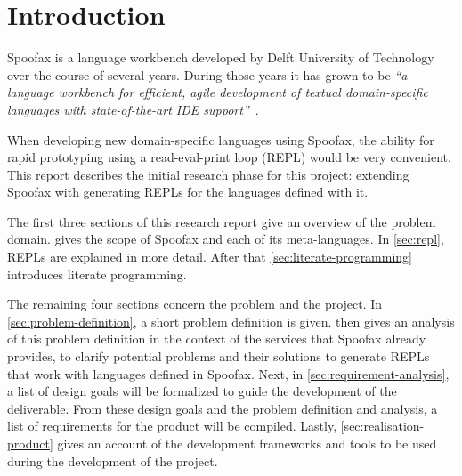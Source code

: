 \section*{Introduction}
\label{sec:introduction}

Spoofax is a language workbench developed by Delft University of
Technology over the course of several years. During those years it has
grown to be \textit{``a language workbench for efficient, agile
  development of textual domain-specific languages with
  state-of-the-art IDE support''}~\cite{Kats10a}.

When developing new domain-specific languages using Spoofax, the
ability for rapid prototyping using a read-eval-print loop (REPL)
would be very convenient. This report describes the initial research
phase for this project: extending Spoofax with generating REPLs for the
languages defined with it.

The first three sections of this research report give an overview of
the problem domain.  gives the scope of Spoofax and
each of its meta-languages. In \cref{sec:repl}, REPLs are explained in
more detail. After that \cref{sec:literate-programming} introduces
literate programming.

The remaining four sections concern the problem and the project. In
\cref{sec:problem-definition}, a short problem definition is
given.  then gives an analysis of this
problem definition in the context of the services that Spoofax already
provides, to clarify potential problems and their solutions to
generate REPLs that work with languages defined in Spoofax. Next, in
\cref{sec:requirement-analysis}, a list of design goals will be
formalized to guide the development of the deliverable. From these
design goals and the problem definition and analysis, a list of
requirements for the product will be compiled. Lastly,
\cref{sec:realisation-product} gives an account of the development
frameworks and tools to be used during the development of the project.

